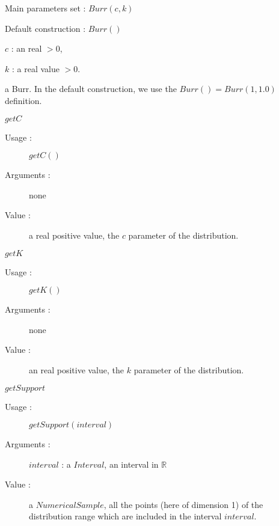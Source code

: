 \begin{description}

\item[Usage :]\rule{0pt}{1em}
  \begin{description}
  \item Main parameters set : $Burr(c,k)$
  \item  Default construction : $Burr()$
  \end{description}

\item[Arguments :]  \rule{0pt}{1em}
  \begin{description}
  \item $c$ : an real $>0$,
  \item  $k$ : a real value $>0$.
  \end{description}

\item[Value :] a Burr. In the default construction, we use the $Burr() = Burr(1,1.0)$ definition.

\item[Some methods :] \rule{0pt}{1em}
  \begin{description}

  \item $getC$
    \begin{description}
    \item[Usage :] $getC()$
    \item[Arguments :] none
    \item[Value :]  a real positive value, the $c$ parameter of the  distribution.
    \end{description}
    \bigskip

  \item $getK$
    \begin{description}
    \item[Usage :] $getK()$
    \item[Arguments :] none
    \item[Value :]  an real positive value, the $k$ parameter of the  distribution.
    \end{description}
    \bigskip

  \item $getSupport$
    \begin{description}
    \item[Usage :] $getSupport(interval)$
    \item[Arguments :] $interval$ : a $Interval$, an interval in $\mathbb{R}$
    \item[Value :]  a $NumericalSample$, all the points (here of dimension 1) of the distribution range which are included in the interval $interval$.
    \end{description}


\end{description}
\end{description}
